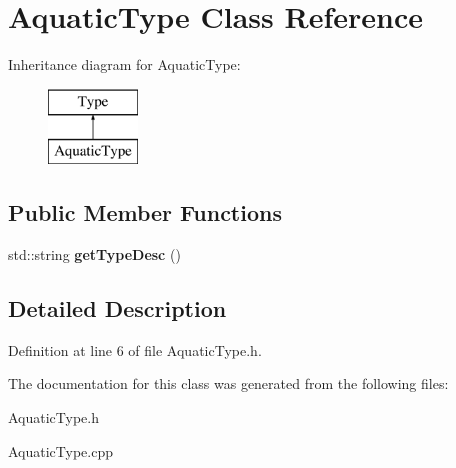 \hypertarget{classAquaticType}{}\section{Aquatic\+Type Class Reference}
\label{classAquaticType}
Inheritance diagram for Aquatic\+Type\+:\begin{figure}[H]
\begin{center}
\leavevmode
\includegraphics[height=2.000000cm]{classAquaticType}
\end{center}
\end{figure}
\subsection*{Public Member Functions}
\begin{DoxyCompactItemize}
\item 
\mbox{\label{classAquaticType_abb1b9ebdb96a352e0287f7a7cb803eab}} 
std\+::string {\bfseries get\+Type\+Desc} ()
\end{DoxyCompactItemize}


\subsection{Detailed Description}


Definition at line 6 of file Aquatic\+Type.\+h.



The documentation for this class was generated from the following files\+:\begin{DoxyCompactItemize}
\item 
Aquatic\+Type.\+h\item 
Aquatic\+Type.\+cpp\end{DoxyCompactItemize}
